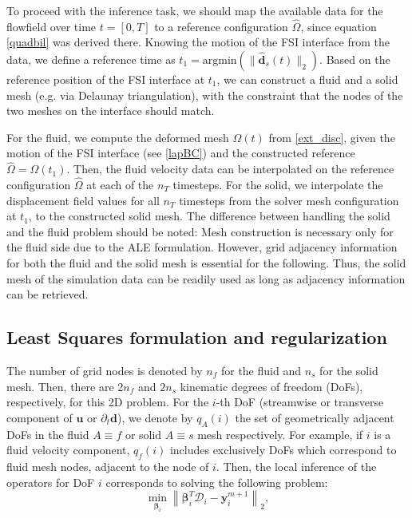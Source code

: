 \documentclass[%
  onecolumn
]{mpi2015-cscpreprint}
\begin{document}
To proceed with the inference task, we should map the available data for the flowfield over time $t=[0,T]$ to a reference configuration $\hat{\Omega}$, since equation \cref{quadbil} was derived there. Knowing the motion of the FSI interface from the data, we define a reference time as $t_1=\text{argmin}(\| \hat{\mathbf{d}}_{s}(t) \|_2 )$. Based on the reference position of the FSI interface at $t_1$, we can construct a fluid and a solid mesh (e.g. via Delaunay triangulation), with the constraint that the nodes of the two meshes on the interface should match. 

For the fluid, we compute the deformed mesh $\Omega(t)$ from \cref{ext_disc}, given the motion of the FSI interface (see \cref{lapBC}) and the constructed reference $\hat{\Omega}=\Omega(t_1)$. Then, the fluid velocity data can be interpolated on the reference configuration $\hat{\Omega}$ at each of the $n_T$ timesteps. For the solid, we interpolate the displacement field values for all $n_T$ timesteps from the solver mesh configuration at $t_1$, to the constructed solid mesh. The difference between handling the solid and the fluid problem should be noted: Mesh construction is necessary only for the fluid side due to the ALE formulation. However, grid adjacency information for both the fluid and the solid mesh is essential for the following. Thus, the solid mesh of the simulation data can be readily used as long as adjacency information can be retrieved.

\subsection{Least Squares formulation and regularization}

The number of grid nodes is denoted by $n_f$ for the fluid and $n_s$ for the solid mesh. Then, there are $2n_f$ and $2n_s$ kinematic degrees of freedom (DoFs), respectively, for this 2D problem. For the $i$-th DoF (streamwise or transverse component of $\mathbf{u}$ or $\partial_{t}\mathbf{d}$), we denote by $q_A(i)$ the set of geometrically adjacent DoFs in the fluid $A\equiv f$ or solid $A\equiv s$ mesh respectively. For example, if $i$ is a fluid velocity component, $q_f(i)$ includes exclusively DoFs which correspond to fluid mesh nodes, adjacent to the node of $i$. Then, the local inference of the operators for DoF $i$ corresponds to solving the following problem:
\begin{equation} 
\label{LS_noreg}
\min _{\boldsymbol{\beta}_i}\left\| \boldsymbol{\beta}_i^T \mathcal{D}_i-\mathbf{y}_i^{m+1}\right\|_{2},
\end{equation}
\end{document}
